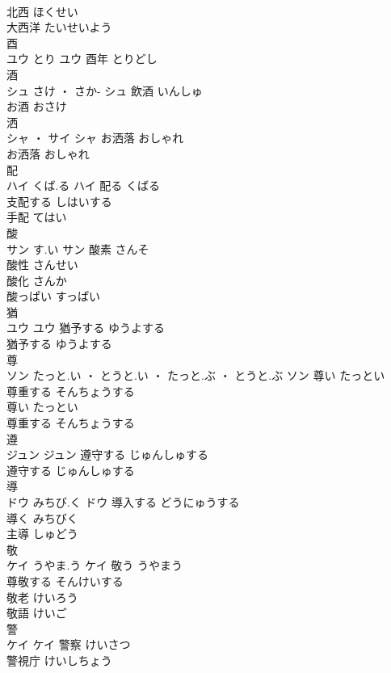 \documentclass[8pt]{extreport}
\begin{document}
\begin{CJK}{UTF8}{min}
\\	北西	ほくせい	
\\	大西洋	たいせいよう	
\\	酉	
\\	ユウ	とり	ユウ	酉年	とりどし	
\\	酒	
\\	シュ	さけ ・ さか-	シュ													飲酒	いんしゅ	
\\	お酒	おさけ	
\\	洒	
\\	シャ ・ サイ		シャ	お洒落	おしゃれ	
\\	お洒落	おしゃれ	
\\	配	
\\	ハイ	くば.る	ハイ	配る	くばる	
\\	支配する	しはいする	
\\	手配	てはい	
\\	酸	
\\	サン	す.い	サン	酸素	さんそ	
\\	酸性	さんせい	
\\	酸化	さんか	
\\	酸っぱい	すっぱい	
\\	猶	
\\	ユウ		ユウ	猶予する	ゆうよする	
\\	猶予する	ゆうよする	
\\	尊	
\\	ソン	たっと.い ・ とうと.い ・ たっと.ぶ ・ とうと.ぶ	ソン	尊い	たっとい	
\\	尊重する	そんちょうする	
\\	尊い	たっとい	
\\	尊重する	そんちょうする	
\\	遵	
\\	ジュン		ジュン	遵守する	じゅんしゅする	
\\	遵守する	じゅんしゅする	
\\	導	
\\	ドウ	みちび.く	ドウ	導入する	どうにゅうする	
\\	導く	みちびく	
\\	主導	しゅどう	
\\	敬	
\\	ケイ	うやま.う	ケイ	敬う	うやまう	
\\	尊敬する	そんけいする	
\\	敬老	けいろう	
\\	敬語	けいご	
\\	警	
\\	ケイ		ケイ	警察	けいさつ	
\\	警視庁	けいしちょう	

\end{CJK}
\end{document}
